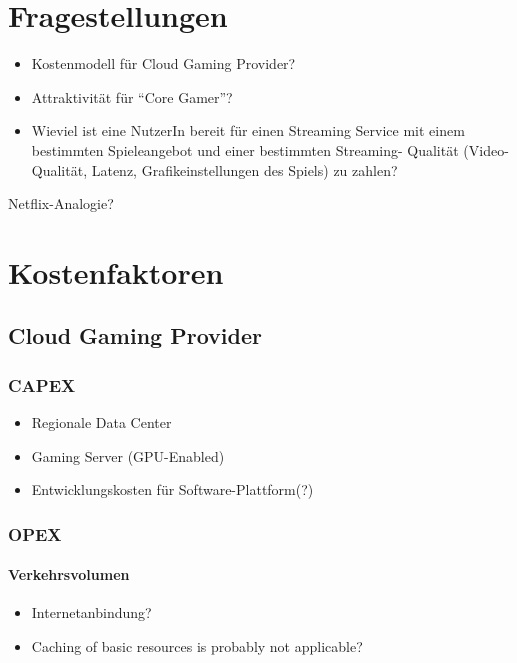 


\section{Fragestellungen}

\begin{itemize}
	\item Kostenmodell für Cloud Gaming Provider?
	\item Attraktivität für “Core Gamer”?
	\item Wieviel ist eine NutzerIn bereit für einen Streaming Service mit einem bestimmten Spieleangebot und einer bestimmten Streaming- Qualität (Video-Qualität, Latenz, Grafikeinstellungen des Spiels) zu zahlen?
\end{itemize}

Netflix-Analogie? 


\section{Kostenfaktoren}

\subsection{Cloud Gaming Provider}

\subsubsection{CAPEX}

\begin{itemize}
	\item Regionale Data Center
	\item Gaming Server (GPU-Enabled)
	\item Entwicklungskosten für Software-Plattform(?)
\end{itemize}

\subsubsection{OPEX}

\paragraph{Verkehrsvolumen}

\begin{itemize}
	\item Internetanbindung?
	\item Caching of basic resources is probably not applicable?
\end{itemize}

